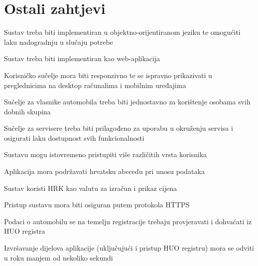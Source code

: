    	
\eject

\section{Ostali zahtjevi}

			 	\begin{packed_item}

                \item Sustav treba biti implementiran u objektno-orijentiranom jeziku te omogućiti laku nadogradnju u slučaju potrebe
                \item Sustav treba biti implementiran kao web-aplikacija
                \item Korisničko sučelje mora biti responzivno te se ispravno prikazivati u preglednicima na desktop računalima i mobilnim uređajima
                \item Sučelje za vlasnike automobila treba biti jednostavno za korištenje osobama svih dobnih skupina
                \item Sučelje za servisere treba biti prilagođeno za uporabu u okruženju servisa i osigurati laku dostupnost svih funkcionalnosti
			 	\item Sustavu mogu istovremeno pristupiti više različitih vrsta korisnika
			 	\item Aplikacija mora podržavati hrvatsku abecedu pri unosu podataka
			 	\item Sustav koristi HRK kao valutu za izračun i prikaz cijena
			 	\item Pristup sustavu mora biti osiguran putem protokola HTTPS
			 	\item Podaci o automobilu se na temelju registracije trebaju provjeravati i dohvaćati iz HUO registra
			 	\item Izvršavanje dijelova aplikacije (uključujući i pristup HUO registru) mora se odviti u roku manjem od nekoliko sekundi

			 \end{packed_item}

